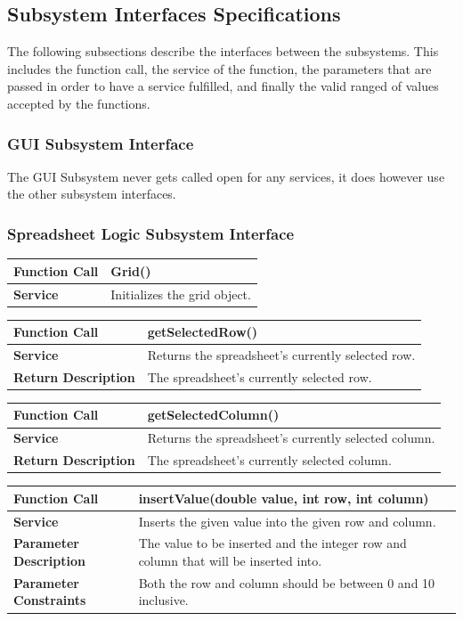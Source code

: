\documentclass[12pt]{article}
\begin{document}
\subsection{Subsystem Interfaces Specifications}
The following subsections describe the interfaces between the subsystems. This includes the function call, the service of the function, the parameters that are passed in order to have a service fulfilled, and finally the valid ranged of values accepted by the functions.
\subsubsection{GUI Subsystem Interface}
The GUI Subsystem never gets called open for any services, it does however use the other subsystem interfaces.
\subsubsection{Spreadsheet Logic Subsystem Interface}

\begin{tabular}{|p{4.75cm}|p{11.25cm}|}
\hline
\textbf{Function Call} & Grid()
\\\hline
\textbf{Service} & Initializes the grid object.
\\\hline
\end{tabular}

\begin{tabular}{|p{4.75cm}|p{11.25cm}|}
\hline
\textbf{Function Call} & getSelectedRow()
\\\hline
\textbf{Service} & Returns the spreadsheet's currently selected row.
\\\hline
\textbf{Return Description} & The spreadsheet's currently selected row.
\\\hline
\end{tabular}

\begin{tabular}{|p{4.75cm}|p{11.25cm}|}
\hline
\textbf{Function Call} & getSelectedColumn()
\\\hline
\textbf{Service} & Returns the spreadsheet's currently selected column.
\\\hline
\textbf{Return Description} & The spreadsheet's currently selected column.
\\\hline
\end{tabular}

\begin{tabular}{|p{4.75cm}|p{11.25cm}|}
\hline
\textbf{Function Call} & insertValue(double value, int row, int column)
\\\hline
\textbf{Service} & Inserts the given value into the given row and column.
\\\hline
\textbf{Parameter Description} & The value to be inserted and the integer row and column that will be inserted into.
\\\hline
\textbf{Parameter Constraints} & Both the row and column should be between 0 and 10 inclusive.
\\\hline
\end{tabular}
\end{document}

